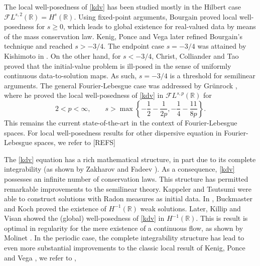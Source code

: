 \documentclass[%
11pt,  reqno]{amsart}
\newcommand{\5}{\textup{V}}
\theoremstyle{remark}
\newcommand{\R}{\mathbb{R}}
\numberwithin{equation}{section}
\numberwithin{theorem}{section}
\begin{document}
	
	
	
	\medskip
	
	The local well-posedness of \eqref{kdv} has been studied mostly in the Hilbert case $\mathcal{F}L^{s,2}(\R)=H^s(\R)$. Using fixed-point arguments, Bourgain \cite{bourg2} proved local well-posedness for $s\ge 0$, which leads to global existence for real-valued data by means of the mass conservation law. Kenig, Ponce and Vega \cite{kpv_bilin} later refined Bourgain's technique and reached $s>-3/4$. The endpoint case $s=-3/4$ was attained by Kishimoto in \cite{Kishimoto_lwp_crit}. On the other hand, for $s<-3/4$, Christ, Colliander and Tao \cite{CCT_ill} proved that the initial-value problem is ill-posed in the sense of uniformly continuous data-to-solution maps. As such, $s=-3/4$ is a threshold for semilinear arguments. The general Fourier-Lebesgue case was addressed by Grünrock \cite{Grunrock_ldv_hier}, where he proved the local well-posedness of \eqref{kdv} in $\mathcal{F}L^{s,p}(\R)$ for
	\begin{equation}
		2<p<\infty,\qquad s>\max\left\{ -\frac12 - \frac{1}{2p}, -\frac14 - \frac{11}{8p} \right\}.\label{eq:sp_grunrock}
	\end{equation}
	This remains the current state-of-the-art in the context of Fourier-Lebesgue spaces. For local well-posedness results for other dispersive equation in Fourier-Lebesgue spaces, we refer to \cite{adams, Chapouto_FL_mkdv, Grunrock_mkdv} [REFS]
	
	\medskip
	
	The \eqref{kdv} equation has a rich mathematical structure, in part due to its complete integrability (as shown by  Zakharov and Fadeev \cite{ZakharovFadeev}). As a consequence, \eqref{kdv} possesses an infinite number of conservation laws. This structure has permitted remarkable improvements to the semilinear theory. Kappeler \cite{Kappeler_rough} and Tsutsumi \cite{Tsutsumi_kdv_measures} were able to construct solutions with Radon measures as initial data. In \cite{BuckmasterKoch}, Buckmaster and Koch proved the existence of $H^{-1}(\R)$ weak solutions. Later, Killip and Visan \cite{KillipVisan_kdv} showed the (global) well-posedness of \eqref{kdv} in $H^{-1}(\R)$. This is result is optimal in regularity for the mere existence  of a continuous flow, as shown by Molinet \cite{Molinet_ill_line}. In the periodic case, the complete integrability structure has lead to even more substantial improvements to the classic local result of Kenig, Ponce and Vega \cite{kpv_bilin}, we refer to \cite{KT06, KMMT16, KappelerMolnar18},
	
\end{document}

